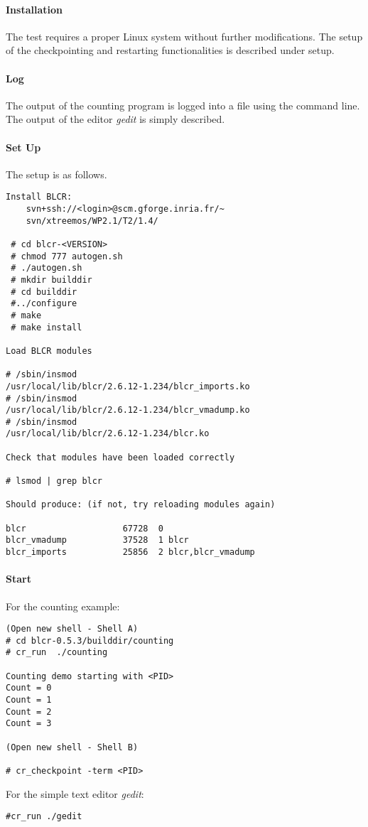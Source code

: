 \paragraph{Installation}
The test requires a proper Linux system without further modifications. The setup of the checkpointing and restarting functionalities is described under setup.

\paragraph{Log}
The output of the counting program is logged into a file using the command line. The output of the editor \emph{gedit} is simply described.

\paragraph{Set Up}
The setup is as follows.\\
\begin{lstlisting}
Install BLCR:
 	svn+ssh://<login>@scm.gforge.inria.fr/~
 	svn/xtreemos/WP2.1/T2/1.4/

 # cd blcr-<VERSION>
 # chmod 777 autogen.sh
 # ./autogen.sh
 # mkdir builddir
 # cd builddir
 #../configure
 # make
 # make install

Load BLCR modules

# /sbin/insmod 
/usr/local/lib/blcr/2.6.12-1.234/blcr_imports.ko
# /sbin/insmod 
/usr/local/lib/blcr/2.6.12-1.234/blcr_vmadump.ko
# /sbin/insmod 
/usr/local/lib/blcr/2.6.12-1.234/blcr.ko

Check that modules have been loaded correctly

# lsmod | grep blcr

Should produce: (if not, try reloading modules again)

blcr                   67728  0
blcr_vmadump           37528  1 blcr
blcr_imports           25856  2 blcr,blcr_vmadump
\end{lstlisting}

\paragraph{Start}
For the counting example:\\
\begin{lstlisting}
(Open new shell - Shell A)
# cd blcr-0.5.3/builddir/counting
# cr_run  ./counting

Counting demo starting with <PID>
Count = 0
Count = 1
Count = 2
Count = 3

(Open new shell - Shell B)

# cr_checkpoint -term <PID>
\end{lstlisting}
For the simple text editor \emph{gedit}:\\
\begin{lstlisting}
#cr_run ./gedit
\end{lstlisting}


